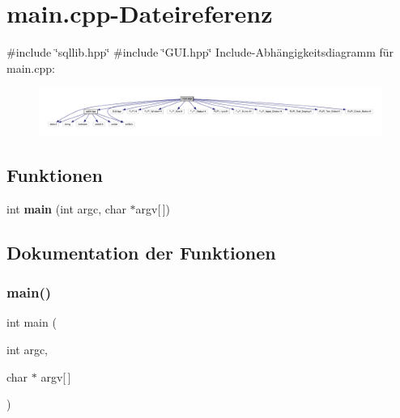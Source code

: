 \section{main.\+cpp-\/\+Dateireferenz}
\label{main_8cpp}
{\ttfamily \#include \char`\"{}sqllib.\+hpp\char`\"{}}\newline
{\ttfamily \#include \char`\"{}G\+U\+I.\+hpp\char`\"{}}\newline
Include-\/\+Abhängigkeitsdiagramm für main.\+cpp\+:\nopagebreak
\begin{figure}[H]
\begin{center}
\leavevmode
\includegraphics[width=350pt]{main_8cpp__incl}
\end{center}
\end{figure}
\subsection*{Funktionen}
\begin{DoxyCompactItemize}
\item 
int \textbf{ main} (int argc, char $\ast$argv[$\,$])
\end{DoxyCompactItemize}


\subsection{Dokumentation der Funktionen}
\mbox{\label{main_8cpp_a0ddf1224851353fc92bfbff6f499fa97}} 
\subsubsection{main()}
{\footnotesize\ttfamily int main (\begin{DoxyParamCaption}\item[{int}]{argc,  }\item[{char $\ast$}]{argv[$\,$] }\end{DoxyParamCaption})}

